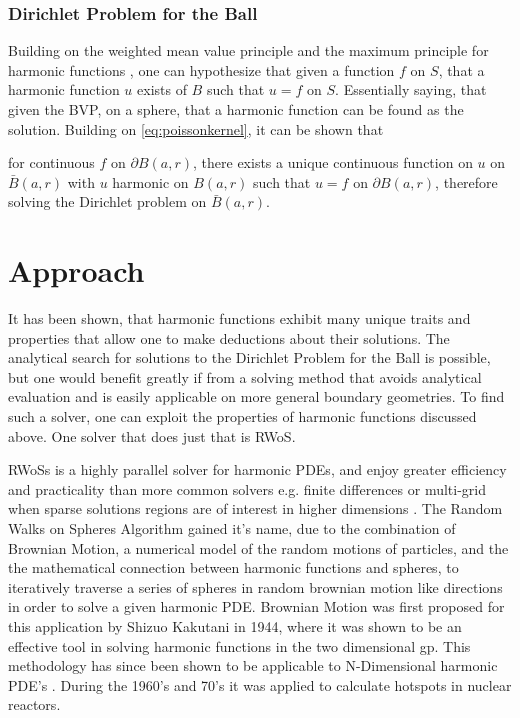   \subsubsection{Dirichlet Problem for the Ball}
  Building on the weighted mean value principle and the maximum principle for harmonic functions
  , one can hypothesize that given a function $f$ on $S$, that a harmonic function $u$
  exists of $B$ such that $u = f$ on $S$. Essentially saying, that given the \gls{BVP},
  on a sphere, that a harmonic function can be found as the solution.  Building on
  \ref{eq:poissonkernel}, it can be shown that
\begin{theorem}
  for continuous $f$ on  $\partial B(a,r)$,
there exists a unique continuous function on $u$ on $\bar{B}(a,r)$ with $u$ harmonic on
$B(a,r)$ such that $ u = f $ on
$\partial B(a,r)$, therefore solving the Dirichlet problem on $\bar{B}(a,r)$\cite{Axler1992}.
\end{theorem}

\section{Approach}
It has been shown, that harmonic functions exhibit many unique traits and properties
that allow one to make deductions about their solutions.  The analytical search for solutions to
the Dirichlet Problem for the Ball is possible, but one would benefit greatly if
from a solving method that avoids analytical evaluation and is easily applicable on more
general boundary geometries.  To find such a solver, one can exploit the properties
of harmonic functions discussed above.  One solver that does just that is \Gls{RWoS}.
\par
 \Glspl{RWoS} is a highly parallel solver for harmonic \Glspl{PDE}, %
and enjoy greater efficiency and practicality than more common solvers e.g.
finite differences or multi-grid when sparse solutions regions are of
interest in higher dimensions \cite{DeLaurentis}\cite{Bornemann}\cite{Yang}.  The Random Walks on Spheres Algorithm
gained it's name, due to the combination of Brownian Motion, a numerical model
of the random motions of particles, and the the mathematical connection between
harmonic functions and spheres\cite{Axler1992}, to iteratively traverse a series %
of spheres in random brownian motion like directions %
in order to solve a given harmonic PDE\cite{DeLaurentis}.
Brownian Motion
was first
proposed for this application by Shizuo Kakutani in 1944\cite{kakutani},
where it was shown to be an effective tool
in solving harmonic functions in the two dimensional \Gls{gp}.  This methodology has since been
shown to be applicable to N-Dimensional harmonic PDE's \cite{DeLaurentis}.  During the 1960's
and 70's it was applied to calculate hotspots in nuclear reactors\cite{Bornemann}.

